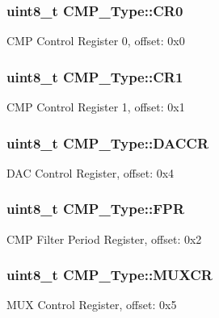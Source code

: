 \subsubsection[{\texorpdfstring{C\+R0}{CR0}}]{ uint8\+\_\+t C\+M\+P\+\_\+\+Type\+::\+C\+R0}\hypertarget{structCMP__Type_ad84d485b61d0a301e766a2b58e0c2b39}{}\label{structCMP__Type_ad84d485b61d0a301e766a2b58e0c2b39}
C\+MP Control Register 0, offset\+: 0x0 
\subsubsection[{\texorpdfstring{C\+R1}{CR1}}]{ uint8\+\_\+t C\+M\+P\+\_\+\+Type\+::\+C\+R1}\hypertarget{structCMP__Type_a47763017202bec732ed0b9fe089f0820}{}\label{structCMP__Type_a47763017202bec732ed0b9fe089f0820}
C\+MP Control Register 1, offset\+: 0x1 
\subsubsection[{\texorpdfstring{D\+A\+C\+CR}{DACCR}}]{ uint8\+\_\+t C\+M\+P\+\_\+\+Type\+::\+D\+A\+C\+CR}\hypertarget{structCMP__Type_a13eed556a0b4ba771dbe4cf5ff71d156}{}\label{structCMP__Type_a13eed556a0b4ba771dbe4cf5ff71d156}
D\+AC Control Register, offset\+: 0x4 
\subsubsection[{\texorpdfstring{F\+PR}{FPR}}]{ uint8\+\_\+t C\+M\+P\+\_\+\+Type\+::\+F\+PR}\hypertarget{structCMP__Type_a47d6d877c8d3ddc7febc7314cf1a0376}{}\label{structCMP__Type_a47d6d877c8d3ddc7febc7314cf1a0376}
C\+MP Filter Period Register, offset\+: 0x2 
\subsubsection[{\texorpdfstring{M\+U\+X\+CR}{MUXCR}}]{ uint8\+\_\+t C\+M\+P\+\_\+\+Type\+::\+M\+U\+X\+CR}\hypertarget{structCMP__Type_a6d02ec6f721c03aadaab1c0555cd9fdd}{}\label{structCMP__Type_a6d02ec6f721c03aadaab1c0555cd9fdd}
M\+UX Control Register, offset\+: 0x5 
